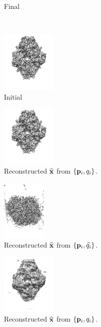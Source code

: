 \begin{figure}[t]
\begin{subfigure}[b]{0.23\linewidth}
        \caption{Final}%
        \label{fig:5j0n-noise16-reconstruction-true}
    \end{subfigure}
    \\ \vspace{1em}
    \begin{subfigure}[b]{0.23\linewidth}
        \centering
        \includegraphics[height=8em]{figures/5a1a_noise0_init}
        \caption{Initial}%
        \label{fig:5j0n-noise0-reconstruction-recovered}
    \end{subfigure}
    \hfill
    \begin{subfigure}[b]{0.23\linewidth}
        \centering
        \includegraphics[height=8em]{figures/5a1a_noise0_gt}
        \caption{Reconstructed $\widehat{\mathbf{x}}$ from $\{ \mathbf{p}_i, q_i \}$.}%
        \label{fig:5j0n-noise0-reconstruction-true}
    \end{subfigure}
    \hfill
    \begin{subfigure}[b]{0.23\linewidth}
        \centering
        \includegraphics[height=8em]{figures/5a1a_noise0_ap}
        \caption{Reconstructed $\widehat{\mathbf{x}}$ from $\{ \mathbf{p}_i, \widehat{q_i} \}$.}%
        \label{fig:5a1a-noise0-reconstruction-recovered}
    \end{subfigure}
    \hfill
    \begin{subfigure}[b]{0.23\linewidth}
        \centering
        \includegraphics[height=8em]{figures/5a1a_noise0_apr}
        \caption{Reconstructed $\widehat{\mathbf{x}}$ from $\{ \mathbf{p}_i, q_i \}$.}%
        \label{fig:5a1a-noise0-reconstruction-true}
    \end{subfigure}
    \caption{%
    }
\end{figure}

